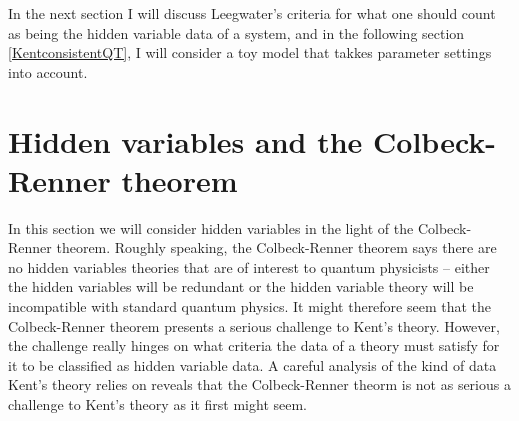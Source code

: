 In the next section I will discuss Leegwater's criteria for what one should count as being the hidden variable data of a system, and in the following section \ref{KentconsistentQT}, I will consider a toy model that takkes parameter settings into account.


\section{Hidden variables and the Colbeck-Renner theorem\label{colbeckrennerthm}}
In this section we will consider hidden variables in the light of the Colbeck-Renner theorem. Roughly speaking, the Colbeck-Renner theorem says there are no hidden variables theories that are of interest to quantum physicists -- either the hidden variables will be redundant or the hidden variable theory will be incompatible with standard quantum physics. It might therefore seem that the Colbeck-Renner theorem presents a serious challenge to Kent's theory. However, the challenge really hinges on what criteria the data of a theory must satisfy for it to be classified as hidden variable data. A careful analysis of the kind of data Kent's theory relies on reveals that the Colbeck-Renner theorm is not as serious a challenge to Kent's theory as it first might seem. 

